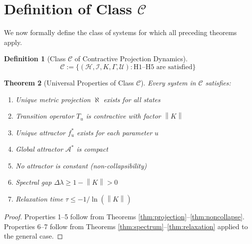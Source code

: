 \documentclass[11pt,a4paper]{article}
\theoremstyle{plain}
\newtheorem{theorem}{Theorem}[section]
\theoremstyle{definition}
\newtheorem{definition}[theorem]{Definition}
\newcommand{\Hilb}{\mathcal{H}}
\newcommand{\I}{\mathcal{I}}
\newcommand{\U}{\mathcal{U}}
\newcommand{\A}{\mathcal{A}}
\newcommand{\norm}[1]{\left\lVert #1 \right\rVert}
\begin{document}
\section{Definition of Class $\mathscr{C}$}

We now formally define the class of systems for which all preceding theorems apply.

\begin{definition}[Class $\mathscr{C}$ of Contractive Projection Dynamics]
\[
\mathscr{C} := \{(\Hilb, \I, K, \Gamma, \U) : \text{H1--H5 are satisfied}\}
\]
\end{definition}

\begin{theorem}[Universal Properties of Class $\mathscr{C}$]\label{thm:universal}
Every system in $\mathscr{C}$ satisfies:
\begin{enumerate}
    \item Unique metric projection $\aleph$ exists for all states
    \item Transition operator $T_u$ is contractive with factor $\norm{K}$
    \item Unique attractor $f^*_u$ exists for each parameter $u$
    \item Global attractor $\A^*$ is compact
    \item No attractor is constant (non-collapsibility)
    \item Spectral gap $\Delta\lambda \geq 1 - \norm{K} > 0$
    \item Relaxation time $\tau \leq -1/\ln(\norm{K})$
\end{enumerate}
\end{theorem}

\begin{proof}
Properties 1--5 follow from Theorems \ref{thm:projection}--\ref{thm:noncollapse}. Properties 6--7 follow from Theorems \ref{thm:spectrum}--\ref{thm:relaxation} applied to the general case.
\end{proof}
\end{document}
